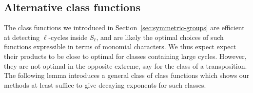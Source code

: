 \documentclass[12pt]{amsart}
\theoremstyle{definition} \newtheorem{definition}[theorem]{Definition}
\theoremstyle{example} \newtheorem{example}[theorem]{Example}
\theoremstyle{remark} \newtheorem{remark}{Remark}[theorem]
\numberwithin{equation}{section}
\numberwithin{theorem}{section}
\begin{document}
\subsection{Alternative class functions}
	\label{subsec:alternative-Sn}
	
	The class functions we introduced in Section~\ref{sec:symmetric-groups} are efficient at detecting $\ell$-cycles inside $S_\ell$, and are likely the optimal choices of such functions expressible in terms of monomial characters.  We thus expect expect their products to be close to optimal for classes containing large cycles.  However, they are not optimal in the opposite extreme, say for the class of a transposition.  The following lemma introduces a general class of class functions which shows our methods at least suffice to give decaying exponents for such classes.
	
\end{document}
